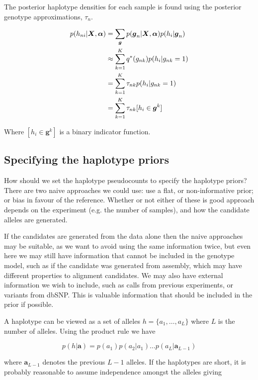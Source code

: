 \documentclass{article}
\begin{document}
The posterior haplotype densities for each sample is found using the posterior genotype approximations, $\tau_{n}$.

\begin{align}
\label{eq:sh_pp}
p(h_{ni} | \boldsymbol{X}, \boldsymbol{\alpha}) &= \sum_{\boldsymbol{g}} p(\boldsymbol{g}_n | \boldsymbol{X}, \boldsymbol{\alpha}) p(h_{i} | \boldsymbol{g}_n) \notag \\
    &\approx \sum_{k = 1}^K q^*(g_{nk}) p(h_{i} | g_{nk} = 1) \notag \\
    &= \sum_{k = 1}^K \tau_{nk} p(h_{i} | g_{nk} = 1) \notag \\
    &= \sum_{k = 1}^K \tau_{nk} [h_i \in \boldsymbol{g}^k]
\end{align}

Where $[h_i \in \boldsymbol{g}^k]$ is a binary indicator function.

\subsection{Specifying the haplotype priors}

How should we set the haplotype pseudocounts to specify the haplotype priors? There are two naive approaches we could use: use a flat, or non-informative prior; or bias in favour of the reference. Whether or not either of these is good approach depends on the experiment (e.g. the number of samples), and how the candidate alleles are generated.

If the candidates are generated from the data alone then the naive approaches may be suitable, as we want to avoid using the same information twice, but even here we may still have information that cannot be included in the genotype model, such as if the candidate was generated from assembly, which may have different properties to alignment candidates. We may also have external information we wish to include, such as calls from previous experiments, or variants from dbSNP. This is valuable information that should be included in the prior if possible.

A haplotype can be viewed as a set of alleles $h = \{a_1, \dots, a_L\}$ where $L$ is the number of alleles. Using the product rule we have

\begin{equation}
    p(h | \boldsymbol{a}) = p(a_1)p(a_2 | a_1)\dots p(a_L | \boldsymbol{a}_{L-1})
\end{equation}

where $\boldsymbol{a}_{L-1}$ denotes the previous $L-1$ alleles. If the haplotypes are short, it is probably reasonable to assume independence amongst the alleles giving
\end{document}

